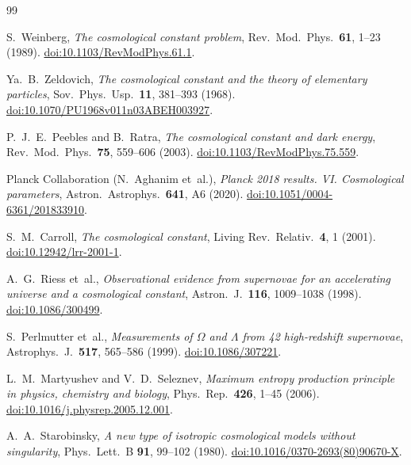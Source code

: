\documentclass[12pt,a4paper]{article}
\theoremstyle{definition}
\theoremstyle{plain}
\theoremstyle{remark}
\begin{document}
\begin{thebibliography}{99}
\sloppy
\raggedright
\setlength{\emergencystretch}{3em}

S.~Weinberg,
\textit{The cosmological constant problem},
Rev.\ Mod.\ Phys.\ \textbf{61}, 1--23 (1989).
\href{https://doi.org/10.1103/RevModPhys.61.1}{doi:10.1103/RevModPhys.61.1}.

Ya.~B.~Zeldovich,
\textit{The cosmological constant and the theory of elementary particles},
Sov.\ Phys.\ Usp.\ \textbf{11}, 381--393 (1968).
\href{https://doi.org/10.1070/PU1968v011n03ABEH003927}{doi:10.1070/PU1968v011n03ABEH003927}.

P.~J.~E.~Peebles and B.~Ratra,
\textit{The cosmological constant and dark energy},
Rev.\ Mod.\ Phys.\ \textbf{75}, 559--606 (2003).
\href{https://doi.org/10.1103/RevModPhys.75.559}{doi:10.1103/RevModPhys.75.559}.

Planck Collaboration (N.~Aghanim et~al.),
\textit{Planck 2018 results. VI. Cosmological parameters},
Astron.\ Astrophys.\ \textbf{641}, A6 (2020).
\href{https://doi.org/10.1051/0004-6361/201833910}{doi:10.1051/0004-6361/201833910}.

S.~M.~Carroll,
\textit{The cosmological constant},
Living Rev.\ Relativ.\ \textbf{4}, 1 (2001).
\href{https://doi.org/10.12942/lrr-2001-1}{doi:10.12942/lrr-2001-1}.

A.~G.~Riess et~al.,
\textit{Observational evidence from supernovae for an accelerating
universe and a cosmological constant},
Astron.\ J.\ \textbf{116}, 1009--1038 (1998).
\href{https://doi.org/10.1086/300499}{doi:10.1086/300499}.

S.~Perlmutter et~al.,
\textit{Measurements of $\Omega$ and $\Lambda$ from 42 high-redshift
supernovae},
Astrophys.\ J.\ \textbf{517}, 565--586 (1999).
\href{https://doi.org/10.1086/307221}{doi:10.1086/307221}.

L.~M.~Martyushev and V.~D.~Seleznev,
\textit{Maxi{\-}mum en{\-}tro{\-}py pro{\-}duc{\-}tion prin{\-}ci{\-}ple in phy{\-}sics, che{\-}mistry and bio{\-}lo{\-}gy},
Phys.\ Rep.\ \textbf{426}, 1--45 (2006).
\href{https://doi.org/10.1016/j.physrep.2005.12.001}{doi:10.1016/j.physrep.2005.12.001}.

A.~A.~Starobinsky,
\textit{A new type of isotropic cosmological models without singularity},
Phys.\ Lett.\ B \textbf{91}, 99--102 (1980).
\href{https://doi.org/10.1016/0370-2693(80)90670-X}{doi:10.1016/0370-2693(80)90670-X}.


\end{thebibliography}
\end{document}
